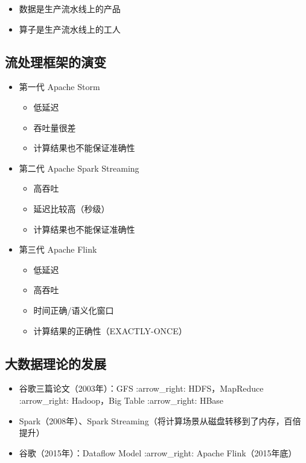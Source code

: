 \begin{itemize}
\tightlist
\item
  数据是生产流水线上的产品
\item
  算子是生产流水线上的工人
\end{itemize}

\hypertarget{ux6d41ux5904ux7406ux6846ux67b6ux7684ux6f14ux53d8}{%
\subsection{流处理框架的演变}\label{ux6d41ux5904ux7406ux6846ux67b6ux7684ux6f14ux53d8}}

\begin{itemize}
\tightlist
\item
  第一代 Apache Storm

  \begin{itemize}
  \tightlist
  \item
    低延迟
  \item
    吞吐量很差
  \item
    计算结果也不能保证准确性
  \end{itemize}
\item
  第二代 Apache Spark Streaming

  \begin{itemize}
  \tightlist
  \item
    高吞吐
  \item
    延迟比较高（秒级）
  \item
    计算结果也不能保证准确性
  \end{itemize}
\item
  第三代 Apache Flink

  \begin{itemize}
  \tightlist
  \item
    低延迟
  \item
    高吞吐
  \item
    时间正确/语义化窗口
  \item
    计算结果的正确性（EXACTLY-ONCE）
  \end{itemize}
\end{itemize}

\hypertarget{ux5927ux6570ux636eux7406ux8bbaux7684ux53d1ux5c55}{%
\subsection{大数据理论的发展}\label{ux5927ux6570ux636eux7406ux8bbaux7684ux53d1ux5c55}}

\begin{itemize}
\tightlist
\item
  谷歌三篇论文（2003年）：GFS :arrow\_right: HDFS，MapReduce
  :arrow\_right: Hadoop，Big Table :arrow\_right: HBase
\item
  Spark（2008年）、Spark
  Streaming（将计算场景从磁盘转移到了内存，百倍提升）
\item
  谷歌（2015年）：Dataflow Model :arrow\_right: Apache Flink（2015年底）
\end{itemize}

